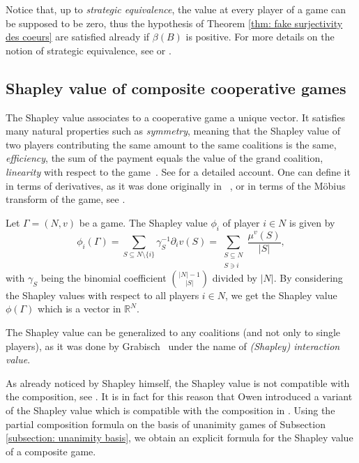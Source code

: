 \documentclass[a4paper,12pt]{amsart}
\begin{document}
\begin{remark}
Notice that, up to \textit{strategic equivalence}, the value at every player of a game can be supposed to be zero, thus the hypothesis of Theorem \ref{thm: fake surjectivity des coeurs} are satisfied already if $\beta(B)$ is positive. For more details on the notion of strategic equivalence, see \cite[Pages 245-246]{vonNeumann2} or \cite{McKinsey}. 
\end{remark}

\subsection{Shapley value of composite cooperative games} The Shapley value associates to a cooperative game a unique vector. It satisfies many natural properties such as \emph{symmetry}, meaning that the Shapley value of two players contributing the same amount to the same coalitions is the same, \emph{efficiency}, the sum of the payment equals the value of the grand coalition, \emph{linearity} with respect to the game~\cite{Shapley1953}. See \cite{algaba2019handbook} for a detailed account. One can define it in terms of derivatives, as it was done originally in ~\cite{Shapley1953}, or in terms of the M{\"o}bius transform of the game, see \cite{harsanyi1958bargaining}. 

\begin{definition}
Let \(\Gamma = (N, v)\) be a game. The Shapley value \(\phi_i\) of player \(i \in N\) is given by
\[
\phi_i(\Gamma) = \sum_{S \subseteq N \setminus \{i\}} \gamma_S^{-1} \partial_iv(S) = \sum_{\substack{S \subseteq N \\ S \ni i}} \frac{\mu^v(S)}{\lvert S \rvert},
\]
with \(\gamma_S\) being the binomial coefficient \(\binom{\lvert N \rvert - 1}{\lvert S \rvert}\) divided by \(\lvert N \rvert\). By considering the Shapley values with respect to all players $i \in N$, we get the Shapley value $\phi(\Gamma)$ which is a vector in $\mathbb{R}^N$.
\end{definition}

\begin{remark}
The Shapley value can be generalized to any coalitions (and not only to single players), as it was done by Grabisch~\cite{grabisch1997alternative} under the name of \emph{(Shapley) interaction value}. 
\end{remark}

As already noticed by Shapley himself, the Shapley value is not compatible with the composition, see \cite{ShapleyComposition}. It is in fact for this reason that Owen introduced a variant of the Shapley value which is compatible with the composition in \cite{Owen77}. Using the partial composition formula on the basis of unanimity games of Subsection \ref{subsection: unanimity basis}, we obtain an explicit formula for the Shapley value of a composite game. 
\end{document}
